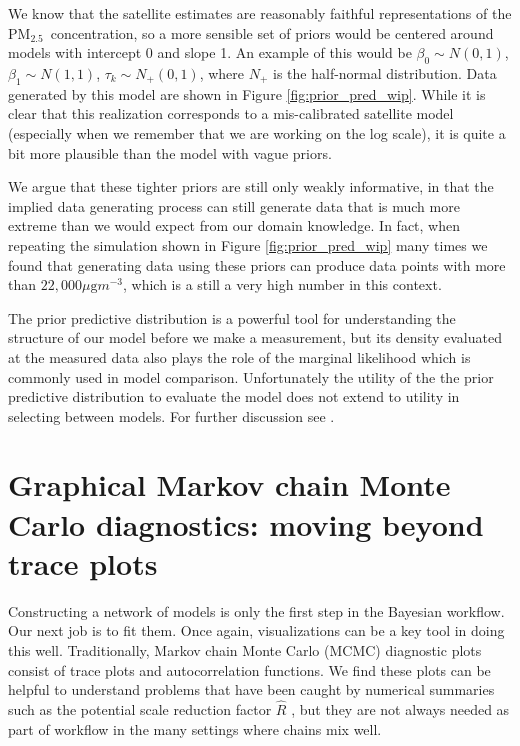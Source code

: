 \documentclass{statsoc}
\newcommand{\PM}{PM$_{2.5}$}
\begin{document}
We know that the satellite estimates are reasonably faithful representations of
the \PM\ concentration, so a more sensible set of priors would be centered
around models with intercept 0 and slope 1.  An example of this would be
$\beta_0 \sim N(0,1)$, $\beta_1 \sim N(1,1)$, $\tau_k \sim N_+(0,1)$, 
where $N_+$ is the half-normal distribution. Data generated 
by this model are shown in Figure \ref{fig:prior_pred_wip}. While it
is clear that this realization corresponds to a mis-calibrated satellite
model (especially when we remember that we are working on the log scale), it is
quite a bit more plausible than the model with vague priors.

We argue that these tighter priors are still only {weakly} informative, in that
the implied data generating process can still generate data that is much more
extreme than we would expect from our domain knowledge.  In fact, when repeating
the simulation shown in Figure \ref{fig:prior_pred_wip} many times we found that
generating data using these priors can produce data points with more than
$22,\!000 \mu\text{g}m^{-3}$, which is a still a very high number in this
context.

The prior predictive distribution is a powerful tool for understanding the
structure of our model before we make a measurement, but its density evaluated
at the measured data also plays the role of the marginal likelihood which is
commonly used in model comparison.  Unfortunately the utility of the the prior
predictive distribution to evaluate the model does not extend to utility in
selecting between models. For further discussion see \citet{gelman2017priors}.


\section{Graphical Markov chain Monte Carlo diagnostics: moving beyond trace plots}
\label{sec:mcmc}

Constructing a network of models is only the first step in the Bayesian
workflow. Our next job is to fit them. Once again, visualizations can be a key
tool in doing this well. Traditionally, Markov chain Monte Carlo (MCMC)
diagnostic plots consist of trace plots and autocorrelation functions.  We find
these plots can be helpful to understand problems that have been caught by
numerical summaries such as the potential scale reduction factor $\widehat{R}$
\citep[Section 30.3]{stanmanual}, but they are not always needed as part of
workflow in the many settings where chains mix well.
\end{document}
